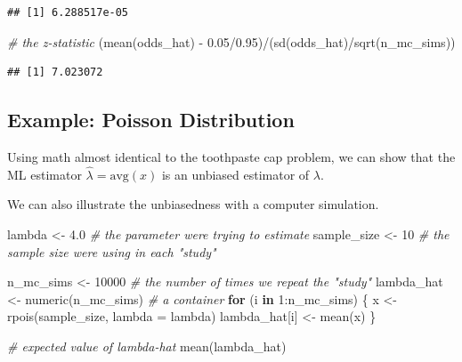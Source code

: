 \documentclass[
]{book}
\newenvironment{Shaded}{\begin{snugshade}}{\end{snugshade}}
\newcommand{\AttributeTok}[1]{\textcolor[rgb]{0.77,0.63,0.00}{#1}}
\newcommand{\CommentTok}[1]{\textcolor[rgb]{0.56,0.35,0.01}{\textit{#1}}}
\newcommand{\ControlFlowTok}[1]{\textcolor[rgb]{0.13,0.29,0.53}{\textbf{#1}}}
\newcommand{\DecValTok}[1]{\textcolor[rgb]{0.00,0.00,0.81}{#1}}
\newcommand{\FloatTok}[1]{\textcolor[rgb]{0.00,0.00,0.81}{#1}}
\newcommand{\FunctionTok}[1]{\textcolor[rgb]{0.00,0.00,0.00}{#1}}
\newcommand{\NormalTok}[1]{#1}
\newcommand{\OtherTok}[1]{\textcolor[rgb]{0.56,0.35,0.01}{#1}}
\newcommand{\SpecialCharTok}[1]{\textcolor[rgb]{0.00,0.00,0.00}{#1}}
\begin{document}
\begin{verbatim}
## [1] 6.288517e-05
\end{verbatim}

\begin{Shaded}
\begin{Highlighting}[]
\CommentTok{\# the z{-}statistic}
\NormalTok{(}\FunctionTok{mean}\NormalTok{(odds\_hat) }\SpecialCharTok{{-}} \FloatTok{0.05}\SpecialCharTok{/}\FloatTok{0.95}\NormalTok{)}\SpecialCharTok{/}\NormalTok{(}\FunctionTok{sd}\NormalTok{(odds\_hat)}\SpecialCharTok{/}\FunctionTok{sqrt}\NormalTok{(n\_mc\_sims))}
\end{Highlighting}
\end{Shaded}

\begin{verbatim}
## [1] 7.023072
\end{verbatim}

\hypertarget{example-poisson-distribution-1}{%
\subsection{Example: Poisson Distribution}\label{example-poisson-distribution-1}}

Using math almost identical to the toothpaste cap problem, we can show that the ML estimator \(\hat{\lambda} = \text{avg}(x)\) is an unbiased estimator of \(\lambda\).

We can also illustrate the unbiasedness with a computer simulation.

\begin{Shaded}
\begin{Highlighting}[]
\NormalTok{lambda }\OtherTok{\textless{}{-}} \FloatTok{4.0}      \CommentTok{\# the parameter we\textquotesingle{}re trying to estimate}
\NormalTok{sample\_size }\OtherTok{\textless{}{-}} \DecValTok{10}  \CommentTok{\# the sample size we\textquotesingle{}re using in each "study"}

\NormalTok{n\_mc\_sims }\OtherTok{\textless{}{-}} \DecValTok{10000}  \CommentTok{\# the number of times we repeat the "study"}
\NormalTok{lambda\_hat }\OtherTok{\textless{}{-}} \FunctionTok{numeric}\NormalTok{(n\_mc\_sims)  }\CommentTok{\# a container }
\ControlFlowTok{for}\NormalTok{ (i }\ControlFlowTok{in} \DecValTok{1}\SpecialCharTok{:}\NormalTok{n\_mc\_sims) \{}
\NormalTok{  x }\OtherTok{\textless{}{-}} \FunctionTok{rpois}\NormalTok{(sample\_size, }\AttributeTok{lambda =}\NormalTok{ lambda)}
\NormalTok{  lambda\_hat[i] }\OtherTok{\textless{}{-}} \FunctionTok{mean}\NormalTok{(x)}
\NormalTok{\}}

\CommentTok{\# expected value of lambda{-}hat}
\FunctionTok{mean}\NormalTok{(lambda\_hat)}
\end{Highlighting}
\end{Shaded}
\end{document}
